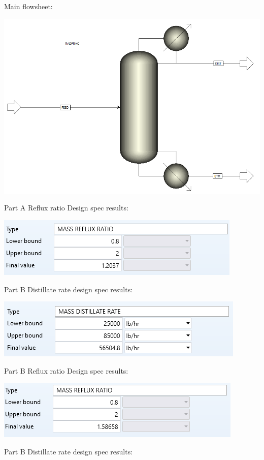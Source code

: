 \documentclass[12pt]{article}
\begin{document}
Main flowsheet:
\begin{center}
    \includegraphics[scale=0.5]{main flowsheet.png}
\end{center}
Part A Reflux ratio Design spec results:
\begin{center}
    \includegraphics{reflux design spec.png}
\end{center}
Part B Distillate rate design spec results:
\begin{center}
    \includegraphics{distillate rate spec.png}
\end{center}
Part B Reflux ratio Design spec results:
\begin{center}
    \includegraphics{reflux design spec B.png}
\end{center}
Part B Distillate rate design spec results:
\end{document}
